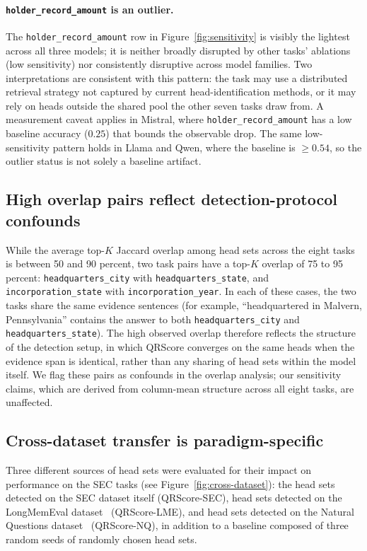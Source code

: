 \paragraph{\texttt{holder\_record\_amount} is an outlier.}
The \texttt{holder\_record\_amount} row in Figure~\ref{fig:sensitivity} is
visibly the lightest across all three models; it is neither broadly
disrupted by other tasks' ablations (low sensitivity) nor consistently
disruptive across model families. Two interpretations are consistent with
this pattern: the task may use a distributed retrieval strategy not
captured by current head-identification methods, or it may rely on heads
outside the shared pool the other seven tasks draw from. A measurement
caveat applies in Mistral, where \texttt{holder\_record\_amount} has a low
baseline accuracy ($0.25$) that bounds the observable drop. The same
low-sensitivity pattern holds in Llama and Qwen, where the baseline is
$\geq 0.54$, so the outlier status is not solely a baseline artifact.
 
\subsection{High overlap pairs reflect detection-protocol confounds}
\label{sec:result-overlap}
 
While the average top-$K$ Jaccard overlap among head sets across the eight
tasks is between 50 and 90 percent, two task pairs have a top-$K$ overlap of
75 to 95 percent: \texttt{headquarters\_city} with
\texttt{headquarters\_state}, and \texttt{incorporation\_state} with
\texttt{incorporation\_year}. In each of these cases, the two tasks share
the same evidence sentences (for example, ``headquartered in Malvern,
Pennsylvania'' contains the answer to both \texttt{headquarters\_city} and
\texttt{headquarters\_state}). The high observed overlap therefore reflects
the structure of the detection setup, in which QRScore converges on the same
heads when the evidence span is identical, rather than any sharing of head
sets within the model itself. We flag these pairs as confounds in the overlap
analysis; our sensitivity claims, which are derived from column-mean
structure across all eight tasks, are unaffected.
 
\subsection{Cross-dataset transfer is paradigm-specific}
\label{sec:result-paradigm}
 
Three different sources of head sets were evaluated for their impact on
performance on the SEC tasks (see Figure~\ref{fig:cross-dataset}): the head
sets detected on the SEC dataset itself (QRScore-SEC), head sets detected on
the LongMemEval dataset~\cite{wu2024longmemeval} (QRScore-LME), and head sets
detected on the Natural Questions dataset~\cite{kwiatkowski2019natural}
(QRScore-NQ), in addition to a baseline composed of three random seeds of
randomly chosen head sets.
 
